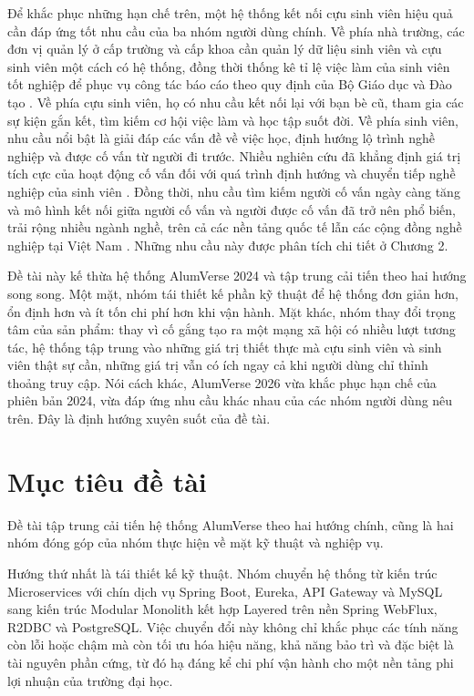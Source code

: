 \documentclass[12pt,a4paper,oneside]{report}
\begin{document}
Để khắc phục những hạn chế trên, một hệ thống kết nối cựu sinh viên hiệu quả cần đáp ứng tốt nhu cầu của ba nhóm người dùng chính. Về phía nhà trường, các đơn vị quản lý ở cấp trường và cấp khoa cần quản lý dữ liệu sinh viên và cựu sinh viên một cách có hệ thống, đồng thời thống kê tỉ lệ việc làm của sinh viên tốt nghiệp để phục vụ công tác báo cáo theo quy định của Bộ Giáo dục và Đào tạo \cite{moet}. Về phía cựu sinh viên, họ có nhu cầu kết nối lại với bạn bè cũ, tham gia các sự kiện gắn kết, tìm kiếm cơ hội việc làm và học tập suốt đời. Về phía sinh viên, nhu cầu nổi bật là giải đáp các vấn đề về việc học, định hướng lộ trình nghề nghiệp và được cố vấn từ người đi trước. Nhiều nghiên cứu đã khẳng định giá trị tích cực của hoạt động cố vấn đối với quá trình định hướng và chuyển tiếp nghề nghiệp của sinh viên \cite{nabi}. Đồng thời, nhu cầu tìm kiếm người cố vấn ngày càng tăng và mô hình kết nối giữa người cố vấn và người được cố vấn đã trở nên phổ biến, trải rộng nhiều ngành nghề, trên cả các nền tảng quốc tế \cite{adplist} lẫn các cộng đồng nghề nghiệp tại Việt Nam \cite{mentori}. Những nhu cầu này được phân tích chi tiết ở Chương 2.

Đề tài này kế thừa hệ thống AlumVerse 2024 và tập trung cải tiến theo hai hướng song song. Một mặt, nhóm tái thiết kế phần kỹ thuật để hệ thống đơn giản hơn, ổn định hơn và ít tốn chi phí hơn khi vận hành. Mặt khác, nhóm thay đổi trọng tâm của sản phẩm: thay vì cố gắng tạo ra một mạng xã hội có nhiều lượt tương tác, hệ thống tập trung vào những giá trị thiết thực mà cựu sinh viên và sinh viên thật sự cần, những giá trị vẫn có ích ngay cả khi người dùng chỉ thỉnh thoảng truy cập. Nói cách khác, AlumVerse 2026 vừa khắc phục hạn chế của phiên bản 2024, vừa đáp ứng nhu cầu khác nhau của các nhóm người dùng nêu trên. Đây là định hướng xuyên suốt của đề tài.

\section{Mục tiêu đề tài}

Đề tài tập trung cải tiến hệ thống AlumVerse theo hai hướng chính, cũng là hai nhóm đóng góp của nhóm thực hiện về mặt kỹ thuật và nghiệp vụ.

Hướng thứ nhất là tái thiết kế kỹ thuật. Nhóm chuyển hệ thống từ kiến trúc Microservices với chín dịch vụ Spring Boot, Eureka, API Gateway và MySQL sang kiến trúc Modular Monolith kết hợp Layered trên nền Spring WebFlux, R2DBC và PostgreSQL. Việc chuyển đổi này không chỉ khắc phục các tính năng còn lỗi hoặc chậm mà còn tối ưu hóa hiệu năng, khả năng bảo trì và đặc biệt là tài nguyên phần cứng, từ đó hạ đáng kể chi phí vận hành cho một nền tảng phi lợi nhuận của trường đại học.
\end{document}
